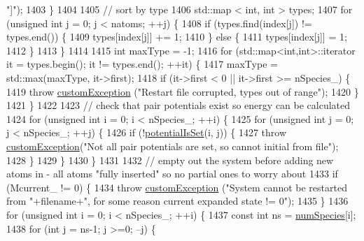 \begin{DoxyCode}
{      "]"});
1403     \}
1404 
1405     \textcolor{comment}{// sort by type}
1406     std::map < int, int > types;
1407     \textcolor{keywordflow}{for} (\textcolor{keywordtype}{unsigned} \textcolor{keywordtype}{int} j = 0; j < natoms; ++j) \{
1408         \textcolor{keywordflow}{if} (types.find(index[j]) != types.end()) \{
1409             types[index[j]] += 1;
1410         \} \textcolor{keywordflow}{else} \{
1411             types[index[j]] = 1;
1412         \}
1413     \}
1414 
1415     \textcolor{keywordtype}{int} maxType = -1;
1416     \textcolor{keywordflow}{for} (std::map<int,int>::iterator it = types.begin(); it != types.end(); ++it) \{
1417         maxType = std::max(maxType, it->first);
1418         \textcolor{keywordflow}{if} (it->first < 0 || it->first >= nSpecies\_) \{
1419             \textcolor{keywordflow}{throw} \hyperlink{classcustom_exception}{customException} (\textcolor{stringliteral}{"Restart file corrupted, types out of range"});
1420         \}
1421     \}
1422 
1423     \textcolor{comment}{// check that pair potentials exist so energy can be calculated}
1424     \textcolor{keywordflow}{for} (\textcolor{keywordtype}{unsigned} \textcolor{keywordtype}{int} i = 0; i < nSpecies\_; ++i) \{
1425         \textcolor{keywordflow}{for} (\textcolor{keywordtype}{unsigned} \textcolor{keywordtype}{int} j = 0; j < nSpecies\_; ++j) \{
1426             \textcolor{keywordflow}{if} (!\hyperlink{classsim_system_a40af191fae6091e26413ee06ae188ae9}{potentialIsSet}(i, j)) \{
1427                 \textcolor{keywordflow}{throw} \hyperlink{classcustom_exception}{customException}(\textcolor{stringliteral}{"Not all pair potentials are set, so cannot initial
       from file"});
1428             \}
1429         \}
1430     \}
1431 
1432     \textcolor{comment}{// empty out the system before adding new atoms in - all atoms "fully inserted" so no partial ones to
       worry about}
1433     \textcolor{keywordflow}{if} (Mcurrent\_ != 0) \{
1434         \textcolor{keywordflow}{throw} \hyperlink{classcustom_exception}{customException} (\textcolor{stringliteral}{"System cannot be restarted from "}+filename+\textcolor{stringliteral}{", for some
       reason current expanded state != 0"});
1435     \}
1436     \textcolor{keywordflow}{for} (\textcolor{keywordtype}{unsigned} \textcolor{keywordtype}{int} i = 0; i < nSpecies\_; ++i) \{
1437         \textcolor{keyword}{const} \textcolor{keywordtype}{int} ns = \hyperlink{classsim_system_a9eea865e6dc1cff377b1e79c4d9c23f0}{numSpecies}[i];
1438         \textcolor{keywordflow}{for} (\textcolor{keywordtype}{int} j = ns-1; j >=0; --j) \{

\end{DoxyCode}

